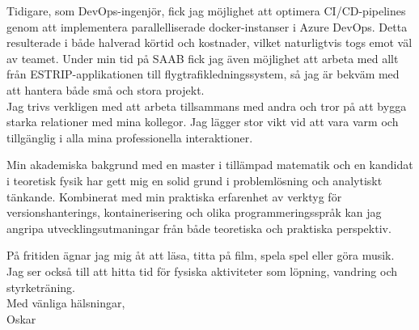\documentclass[lighthipster]{simplehipstercv}
\newlength{\rightcolwidth}
\begin{document}
\begin{paracol}{2}
\begin{minipage}[t]{0.71\textwidth}
Tidigare, som DevOps-ingenjör, fick jag möjlighet att optimera CI/CD-pipelines genom att implementera parallelliserade docker-instanser i Azure DevOps. Detta resulterade i både halverad körtid och kostnader, vilket naturligtvis togs emot väl av teamet. Under min tid på SAAB fick jag även möjlighet att arbeta med allt från ESTRIP-applikationen till flygtrafikledningssystem, så jag är bekväm med att hantera både små och stora projekt.\\

Jag trivs verkligen med att arbeta tillsammans med andra och tror på att bygga starka relationer med mina kollegor. Jag lägger stor vikt vid att vara varm och tillgänglig i alla mina professionella interaktioner.

Min akademiska bakgrund med en master i tillämpad matematik och en kandidat i teoretisk fysik har gett mig en solid grund i problemlösning och analytiskt tänkande. Kombinerat med min praktiska erfarenhet av verktyg för versionshanterings, kontainerisering och olika programmeringsspråk kan jag angripa utvecklingsutmaningar från både teoretiska och praktiska perspektiv.

På fritiden ägnar jag mig åt att läsa, titta på film, spela spel eller göra musik. Jag ser också till att hitta tid för fysiska aktiviteter som löpning, vandring och styrketräning.
\\
Med vänliga hälsningar,\\
Oskar
\end{minipage}

\bigskip


\vfill{} %

\setlength{\parindent}{0pt}
\begin{minipage}[t]{\rightcolwidth}
\begin{center}\fontfamily{\sfdefault}\selectfont \color{black!70}
\end{center}
\end{minipage}

\end{paracol}
\end{document}
